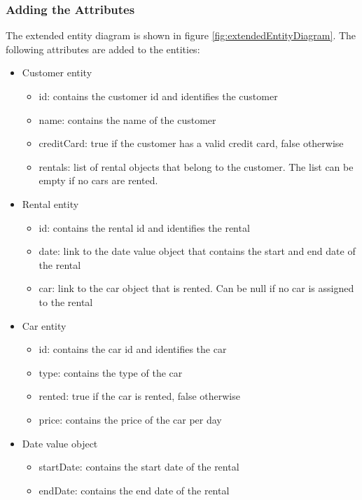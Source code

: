 \subsubsection*{Adding the Attributes}
The extended entity diagram is shown in figure \ref{fig:extendedEntityDiagram}.
The following attributes are added to the entities:
\begin{itemize}
    \item Customer entity
    \begin{itemize}
        \item id: contains the customer id and identifies the customer
        \item name: contains the name of the customer
        \item creditCard: true if the customer has a valid credit card, false otherwise
        \item rentals: list of rental objects that belong to the customer. The list can be empty if no cars are rented.
    \end{itemize}
    \item Rental entity
    \begin{itemize}
        \item id: contains the rental id and identifies the rental
        \item date: link to the date value object that contains the start and end date of the rental
        \item car: link to the car object that is rented. Can be null if no car is assigned to the rental
    \end{itemize}
    \item Car entity
    \begin{itemize}
        \item id: contains the car id and identifies the car
        \item type: contains the type of the car
        \item rented: true if the car is rented, false otherwise
        \item price: contains the price of the car per day
    \end{itemize}
    \item Date value object
    \begin{itemize}
        \item startDate: contains the start date of the rental
        \item endDate: contains the end date of the rental
    \end{itemize}
\end{itemize}

